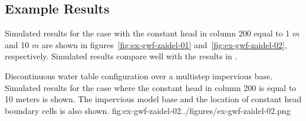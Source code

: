 \subsection{Example Results}

Simulated results for the case with the constant head in column 200 equal to 1 $m$ and 10 $m$ are shown in figures~\ref{fig:ex-gwf-zaidel-01} and~\ref{fig:ex-gwf-zaidel-02}, respectively. Simulated results compare well with the results in \cite{zaidel2013discontinuous}.

\begin{StandardFigure}{
                                     Discontinuous water table configuration over a multistep impervious base.
                                     Simulated results for the case where the constant head in column 200 is equal
                                     to 10 meters is shown. The impervious model base and the location of constant
                                     head boundary cells is also shown.
                                     }{fig:ex-gwf-zaidel-02}{../figures/ex-gwf-zaidel-02.png}
\end{StandardFigure}                                 

